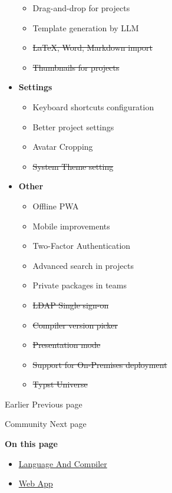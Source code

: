 \begin{itemize}
  \begin{itemize}
  \tightlist
  \item
    Drag-and-drop for projects
  \item
    Template generation by LLM
  \item
    \st{LaTeX, Word, Markdown import}
  \item
    \st{Thumbnails for projects}
  \end{itemize}
\item
  \textbf{Settings}

  \begin{itemize}
  \tightlist
  \item
    Keyboard shortcuts configuration
  \item
    Better project settings
  \item
    Avatar Cropping
  \item
    \st{System Theme setting}
  \end{itemize}
\item
  \textbf{Other}

  \begin{itemize}
  \tightlist
  \item
    Offline PWA
  \item
    Mobile improvements
  \item
    Two-Factor Authentication
  \item
    Advanced search in projects
  \item
    Private packages in teams
  \item
    \st{LDAP Single sign-on}
  \item
    \st{Compiler version picker}
  \item
    \st{Presentation mode}
  \item
    \st{Support for On-Premises deployment}
  \item
    \st{Typst Universe}
  \end{itemize}
\end{itemize}

\href{/docs/changelog/earlier/}{\pandocbounded{}}

{ Earlier } { Previous page }

\href{/docs/community/}{\pandocbounded{}}

{ Community } { Next page }

\textbf{On this page}

\begin{itemize}
\tightlist
\item
  \hyperref[language-and-compiler]{Language And Compiler}
\item
  \hyperref[web-app]{Web App}
\end{itemize}

